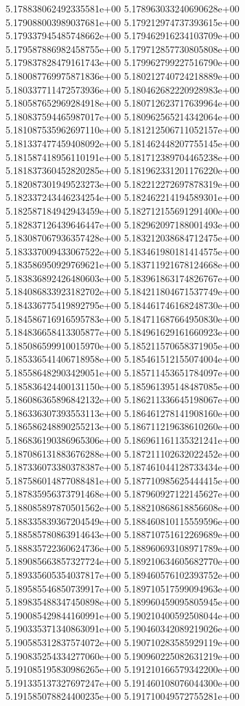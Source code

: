 5.178838062492335581e+00
5.178963033240690628e+00
5.179088003989037681e+00
5.179212974737393615e+00
5.179337945485748662e+00
5.179462916234103709e+00
5.179587886982458755e+00
5.179712857730805808e+00
5.179837828479161743e+00
5.179962799227516790e+00
5.180087769975871836e+00
5.180212740724218889e+00
5.180337711472573936e+00
5.180462682220928983e+00
5.180587652969284918e+00
5.180712623717639964e+00
5.180837594465987017e+00
5.180962565214342064e+00
5.181087535962697110e+00
5.181212506711052157e+00
5.181337477459408092e+00
5.181462448207755145e+00
5.181587418956110191e+00
5.181712389704465238e+00
5.181837360452820285e+00
5.181962331201176220e+00
5.182087301949523273e+00
5.182212272697878319e+00
5.182337243446234254e+00
5.182462214194589301e+00
5.182587184942943459e+00
5.182712155691291400e+00
5.182837126439646447e+00
5.182962097188001493e+00
5.183087067936357428e+00
5.183212038684712475e+00
5.183337009433067522e+00
5.183461980181414575e+00
5.183586950929769621e+00
5.183711921678124668e+00
5.183836892426480603e+00
5.183961863174826767e+00
5.184086833923182702e+00
5.184211804671537749e+00
5.184336775419892795e+00
5.184461746168248730e+00
5.184586716916595783e+00
5.184711687664950830e+00
5.184836658413305877e+00
5.184961629161660923e+00
5.185086599910015970e+00
5.185211570658371905e+00
5.185336541406718958e+00
5.185461512155074004e+00
5.185586482903429051e+00
5.185711453651784097e+00
5.185836424400131150e+00
5.185961395148487085e+00
5.186086365896842132e+00
5.186211336645198067e+00
5.186336307393553113e+00
5.186461278141908160e+00
5.186586248890255213e+00
5.186711219638610260e+00
5.186836190386965306e+00
5.186961161135321241e+00
5.187086131883676288e+00
5.187211102632022452e+00
5.187336073380378387e+00
5.187461044128733434e+00
5.187586014877088481e+00
5.187710985625444415e+00
5.187835956373791468e+00
5.187960927122145627e+00
5.188085897870501562e+00
5.188210868618856608e+00
5.188335839367204549e+00
5.188460810115559596e+00
5.188585780863914643e+00
5.188710751612269689e+00
5.188835722360624736e+00
5.188960693108971789e+00
5.189085663857327724e+00
5.189210634605682770e+00
5.189335605354037817e+00
5.189460576102393752e+00
5.189585546850739917e+00
5.189710517599094963e+00
5.189835488347450898e+00
5.189960459095805945e+00
5.190085429844160991e+00
5.190210400592508044e+00
5.190335371340863091e+00
5.190460342089219026e+00
5.190585312837574072e+00
5.190710283585929119e+00
5.190835254334277060e+00
5.190960225082631219e+00
5.191085195830986265e+00
5.191210166579342200e+00
5.191335137327697247e+00
5.191460108076044300e+00
5.191585078824400235e+00
5.191710049572755281e+00
